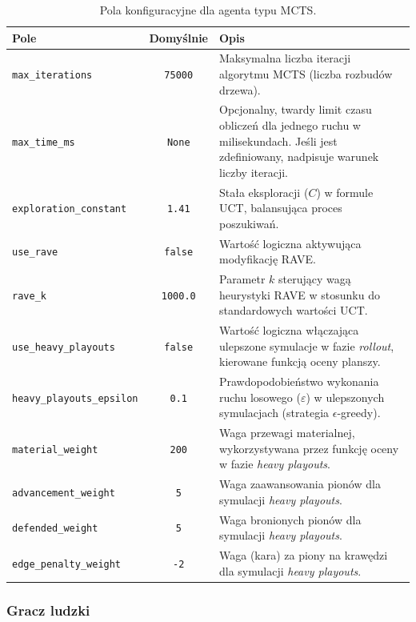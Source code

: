\documentclass{article}
\begin{document}
\begin{table}[H]
    \centering
    \caption{Pola konfiguracyjne dla agenta typu MCTS.}
    \label{tab:config-mcts}
    \renewcommand{\arraystretch}{1.2}
    \begin{tabularx}{\textwidth}{|l|c|X|}
        \hline
        \textbf{Pole} & \textbf{Domyślnie} & \textbf{Opis} \\
        \hline
        \texttt{max\_iterations} & \texttt{75000} & Maksymalna liczba iteracji algorytmu MCTS (liczba rozbudów drzewa). \\
        \texttt{max\_time\_ms} & \texttt{None} & Opcjonalny, twardy limit czasu obliczeń dla jednego ruchu w milisekundach. Jeśli jest zdefiniowany, nadpisuje warunek liczby iteracji. \\
        \texttt{exploration\_constant} & \texttt{1.41} & Stała eksploracji ($C$) w formule UCT, balansująca proces poszukiwań. \\
        \texttt{use\_rave} & \texttt{false} & Wartość logiczna aktywująca modyfikację RAVE. \\
        \texttt{rave\_k} & \texttt{1000.0} & Parametr $k$ sterujący wagą heurystyki RAVE w stosunku do standardowych wartości UCT. \\
        \texttt{use\_heavy\_playouts} & \texttt{false} & Wartość logiczna włączająca ulepszone symulacje w fazie \textit{rollout}, kierowane funkcją oceny planszy. \\
        \texttt{heavy\_playouts\_epsilon} & \texttt{0.1} & Prawdopodobieństwo wykonania ruchu losowego ($\varepsilon$) w ulepszonych symulacjach (strategia $\epsilon$-greedy). \\
        \texttt{material\_weight} & \texttt{200} & Waga przewagi materialnej, wykorzystywana przez funkcję oceny w fazie \textit{heavy playouts}. \\
        \texttt{advancement\_weight} & \texttt{5} & Waga zaawansowania pionów dla symulacji \textit{heavy playouts}. \\
        \texttt{defended\_weight} & \texttt{5} & Waga bronionych pionów dla symulacji \textit{heavy playouts}. \\
        \texttt{edge\_penalty\_weight} & \texttt{-2} & Waga (kara) za piony na krawędzi dla symulacji \textit{heavy playouts}. \\
        \hline
    \end{tabularx}
\end{table}

\subsubsection{Gracz ludzki}
\end{document}
